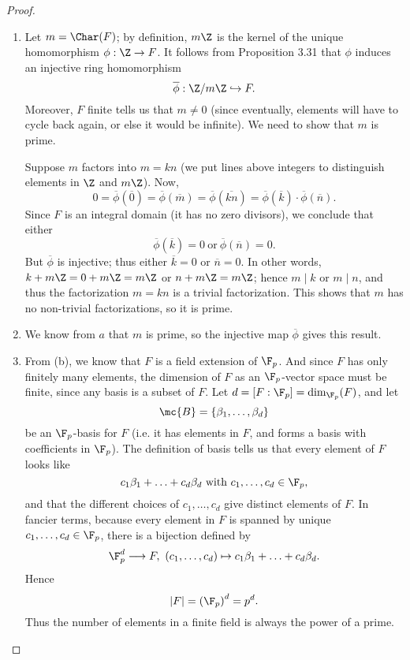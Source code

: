 \documentclass[math1530-lecture-notes]{subfiles}
\begin{document}
\begin{proof}[Proof]
  \begin{enumerate}
    \item Let $m=\Char(F)$; by definition, $m\Z$ is the kernel of the unique homomorphism
      $\phi:\Z\to F$. It follows from Proposition 3.31 that $\phi$ induces an injective ring
      homomorphism \[
        \overline{\phi}: \Z / m\Z \hookrightarrow F
      .\] Moreover, $F$ finite tells us that $m\neq 0$ (since eventually, elements will have to
      cycle back again, or else it would be infinite). We need to show that $m$ is prime.

      Suppose $m$ factors into $m=kn$ (we put lines above integers to distinguish elements in $\Z$
      and $m\Z$). Now, \[
        0=\overline{\phi}(\overline{0})=\overline{\phi}(\overline{m})=\overline{\phi}(\overline{kn})=\overline{\phi}(\overline{k})\cdot
        \overline{\phi}(\overline{n})
      .\] Since $F$ is an integral domain (it has no zero divisors), we conclude that either \[
      \overline{\phi}(\overline{k})=0 ~\text{or}~\overline{\phi}(\overline{n})=0
      .\] But $\overline{\phi}$ is injective; thus either $\overline{k}=0$ or $\overline{n}=0$. In
      other words, $k+m\Z=0+m\Z=m\Z$ or $n+m\Z=m\Z$; hence $m\mid k$ or $m\mid n$, and thus the
      factorization $m=kn$ is a trivial factorization. This shows that $m$ has no non-trivial
      factorizations, so it is prime.
    \item We know from $a$ that $m$ is prime, so the injective map $\overline{\phi}$ gives this
      result.
    \item From (b), we know that $F$ is a field extension of $\F_p$. And since $F$ has only finitely
      many elements, the dimension of $F$ as an $\F_p$-vector space must be finite, since any basis
      is a subset of $F$. Let $d=\left[F : \F_p\right]=\dim_{\F_p}(F)$, and let \[
        \mc{B}=\{ \beta_1,\ldots,\beta_d \}
      \] be an $\F_p$-basis for $F$ (i.e. it has elements in $F$, and forms a basis with
      coefficients in $\F_p$). The definition of basis tells us that every element of $F$ looks like
      \[
        c_1\beta_1+\ldots+c_d\beta_d ~\text{with}~ c_1,\ldots,c_d\in \F_p
      ,\] and that the different choices of $c_1,\ldots,c_d$ give distinct elements of $F$. In
      fancier terms, because every element in $F$ is spanned by unique $c_1,\ldots,c_d\in \F_p$,
      there is a bijection defined by \[
        \F_p^d \longrightarrow F,\ (c_1,\ldots,c_d)\mapsto c_1\beta_1+\ldots+c_d\beta_d
      .\] Hence \[
        \left| F \right| = \left( \F_p \right) ^d=p^d
      .\] Thus the number of elements in a finite field is always the power of a prime.
  \end{enumerate}
\end{proof}
\end{document}
